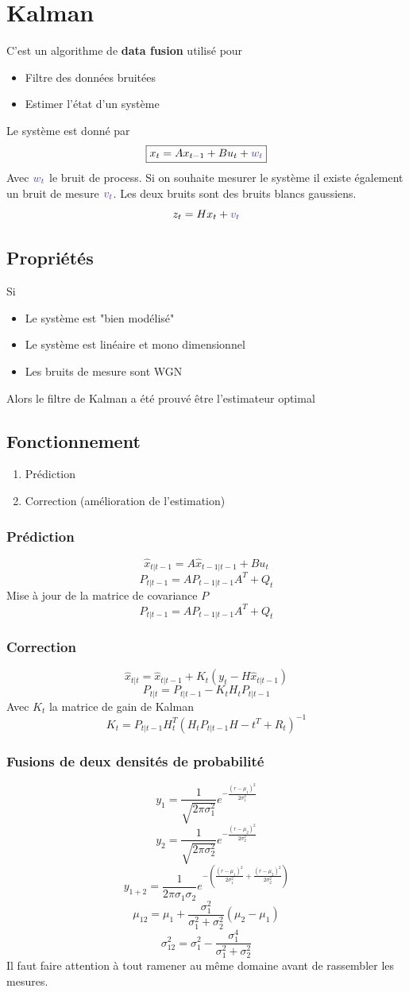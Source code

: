 \documentclass[resume]{subfiles}
\begin{document}
\section{Kalman}
C'est un algorithme de \textbf{data fusion} utilisé pour
\begin{itemize}
\item Filtre des données bruitées
\item Estimer l'état d'un système
\end{itemize}
Le système est donné par
$$\boxed{x_t=Ax_{t-1}+Bu_{t}+\textcolor{Violet}{w_t}}$$
Avec $\textcolor{Violet}{w_t}$ le bruit de process. Si on souhaite mesurer le système il existe également un bruit de mesure $\textcolor{Violet}{v_t}$. Les deux bruits sont des bruits blancs gaussiens.
$$z_t=Hx_t+\textcolor{Violet}{v_t}$$
\subsection{Propriétés}
Si
\begin{itemize}
\item Le système est "bien modélisé"
\item Le système est linéaire et mono dimensionnel
\item Les bruits de mesure sont WGN
\end{itemize}
Alors le filtre de Kalman a été prouvé être l'estimateur optimal
\subsection{Fonctionnement}
\begin{enumerate}
\item Prédiction
\item Correction (amélioration de l'estimation)
\end{enumerate}
\subsubsection{Prédiction}
$$\hat{x}_{t|t-1}=A\hat{x}_{t-1|t-1}+Bu_t$$
$$P_{t|t-1}=AP_{t-1|t-1}A^{T}+Q_t$$
Mise à jour de la matrice de covariance $P$
$$P_{t|t-1}=AP_{t-1|t-1}A^T+Q_t$$
\subsubsection{Correction}
$$\hat{x}_{t|t}=\hat{x}_{t|t-1}+K_t(y_t-H\hat{x}_{t|t-1})$$
$$P_{t|t}=P_{t|t-1}-K_tH_tP_{t|t-1}$$
Avec $K_t$ la matrice de gain de Kalman
$$K_t=P_{t|t-1}H_t^T(H_tP_{t|t-1}H-t^T+R_t)^{-1}$$
\subsubsection{Fusions de deux densités de probabilité}
$$y_1=\frac{1}{\sqrt{2\pi \sigma_1^2}}e^{-\frac{(r-\mu_1)^2}{2\sigma_1^2}}$$
$$y_2=\frac{1}{\sqrt{2\pi \sigma_2^2}}e^{-\frac{(r-\mu_2)^2}{2\sigma_2^2}}$$
$$y_{1+2}=\frac{1}{2\pi\sigma_1\sigma_2}e^{-\left(\frac{(r-\mu_1)^2}{2\sigma_1^2}+\frac{(r-\mu_2)^2}{2\sigma_2^2}\right)}$$
$$\boxed{\mu_{12}=\mu_1+\frac{\sigma_1^2}{\sigma_1^2+\sigma_2^2}\left(\mu_2-\mu_1\right)}$$
$$\boxed{\sigma_{12}^2=\sigma_1^2-\frac{\sigma_1^4}{\sigma_1^2+\sigma_2^2}}$$
Il faut faire attention à tout ramener au même domaine avant de rassembler les mesures.
\end{document}
